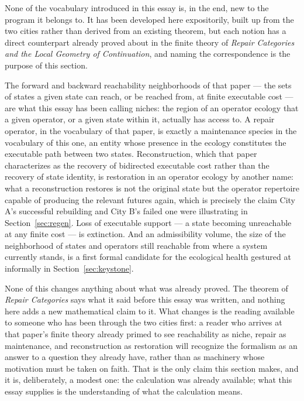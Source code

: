 \documentclass[11pt]{article}
\begin{document}
None of the vocabulary introduced in this essay is, in the end, new to
the program it belongs to. It has been developed here expositorily,
built up from the two cities rather than derived from an existing
theorem, but each notion has a direct counterpart already proved
about in the finite theory of \emph{Repair Categories and the Local
Geometry of Continuation}, and naming the correspondence is the
purpose of this section.

The forward and backward reachability neighborhoods of that paper ---
the sets of states a given state can reach, or be reached from, at
finite executable cost --- are what this essay has been calling
niches: the region of an operator ecology that a given operator, or a
given state within it, actually has access to. A repair operator, in
the vocabulary of that paper, is exactly a maintenance species in the
vocabulary of this one, an entity whose presence in the ecology
constitutes the executable path between two states. Reconstruction,
which that paper characterizes as the recovery of bidirected
executable cost rather than the recovery of state identity, is
restoration in an operator ecology by another name: what a
reconstruction restores is not the original state but the operator
repertoire capable of producing the relevant futures again, which is
precisely the claim City A's successful rebuilding and City B's
failed one were illustrating in Section~\ref{sec:regen}. Loss of
executable support --- a state becoming unreachable at any finite
cost --- is extinction. And an admissibility volume, the size of the
neighborhood of states and operators still reachable from where a
system currently stands, is a first formal candidate for the
ecological health gestured at informally in
Section~\ref{sec:keystone}.

None of this changes anything about what was already proved. The
theorem of \emph{Repair Categories} says what it said before this
essay was written, and nothing here adds a new mathematical claim to
it. What changes is the reading available to someone who has been
through the two cities first: a reader who arrives at that paper's
finite theory already primed to see reachability as niche, repair as
maintenance, and reconstruction as restoration will recognize the
formalism as an answer to a question they already have, rather than
as machinery whose motivation must be taken on faith. That is the only
claim this section makes, and it is, deliberately, a modest one: the
calculation was already available; what this essay supplies is the
understanding of what the calculation means.
\end{document}
